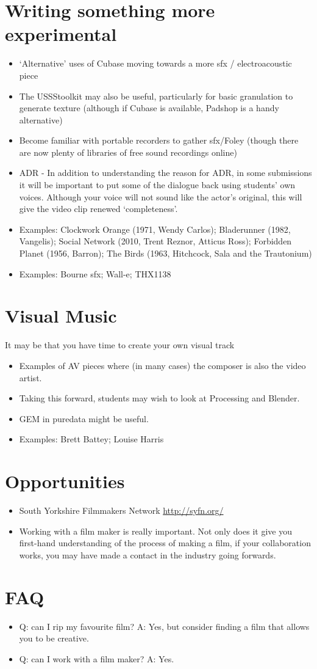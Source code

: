 \section{Writing something more experimental}
\begin{itemize}
\item `Alternative' uses of Cubase moving towards a more sfx / electroacoustic piece
\item The USSStoolkit may also be useful, particularly for basic granulation to generate texture (although if Cubase is available, Padshop is a handy alternative)
\item Become familiar with portable recorders to gather sfx/Foley (though there are now plenty of libraries of free sound recordings online)
\item ADR - In addition to understanding the reason for ADR, in some submissions it will be important to put some of the dialogue back using students' own voices. Although your voice will not sound like the actor's original, this will give the video clip renewed `completeness'.
\item Examples: Clockwork Orange (1971, Wendy Carlos); Bladerunner (1982, Vangelis); Social Network (2010, Trent Reznor, Atticus Ross); Forbidden Planet (1956, Barron); The Birds (1963, Hitchcock, Sala and the Trautonium)
\item Examples: Bourne sfx; Wall-e; THX1138
\end{itemize}



\section{Visual Music}
It may be that you have time to create your own visual track
\begin{itemize}
\item Examples of AV pieces where (in many cases) the composer is also the video artist. 
\item Taking this forward, students may wish to look at Processing and Blender. 
\item GEM in puredata might be useful.
\item Examples: Brett Battey; Louise Harris
\end{itemize}

\section{Opportunities}
\begin{itemize}
\item South Yorkshire Filmmakers Network \url{http://syfn.org/}
\item Working with a film maker is really important. Not only does it give you first-hand understanding of the process of making a film, if your collaboration works, you may have made a contact in the industry going forwards. 
\end{itemize}

\section{FAQ}
\begin{itemize}
\item Q: can I rip my favourite film? A: Yes, but consider finding a film that allows you to be creative. 
\item Q: can I work with a film maker? A: Yes. 
\end{itemize}



